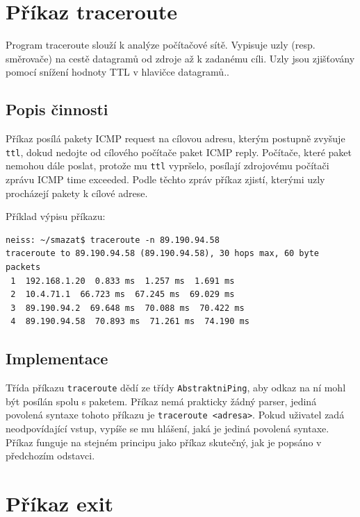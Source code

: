\section{Příkaz traceroute}

Program traceroute slouží k analýze počítačové sítě. Vypisuje uzly (resp. směrovače) na cestě datagramů od zdroje až k zadanému cíli. Uzly jsou zjišťovány pomocí snížení hodnoty TTL v hlavičce datagramů.\cite{wiki:traceroute}.


\subsection{Popis činnosti}

Příkaz posílá pakety ICMP request na cílovou adresu, kterým postupně zvyšuje \verb|ttl|, dokud nedojte od cílového počítače paket ICMP reply. Počítače, které paket nemohou dále poslat, protože mu \verb|ttl| vypršelo, posílají zdrojovému počítači zprávu ICMP time exceeded. Podle těchto zpráv příkaz zjistí, kterými uzly procházejí pakety k cílové adrese.

Příklad výpisu příkazu:
\begin{verbatim}
neiss: ~/smazat$ traceroute -n 89.190.94.58
traceroute to 89.190.94.58 (89.190.94.58), 30 hops max, 60 byte packets
 1  192.168.1.20  0.833 ms  1.257 ms  1.691 ms
 2  10.4.71.1  66.723 ms  67.245 ms  69.029 ms
 3  89.190.94.2  69.648 ms  70.088 ms  70.422 ms
 4  89.190.94.58  70.893 ms  71.261 ms  74.190 ms
\end{verbatim}


\subsection{Implementace}

Třída příkazu \verb|traceroute| dědí ze třídy \verb|AbstraktniPing|, aby odkaz na ní mohl být posílán spolu s paketem. Příkaz nemá prakticky žádný parser, jediná povolená syntaxe tohoto příkazu je \verb|traceroute <adresa>|. Pokud uživatel zadá neodpovídající vstup, vypíše se mu hlášení, jaká je jediná povolená syntaxe. Příkaz funguje na stejném principu jako příkaz skutečný, jak je popsáno v předchozím odstavci.




\section{Příkaz exit}

